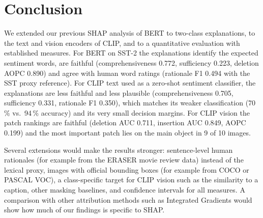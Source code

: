 \documentclass[11pt,a4paper]{article}
\begin{document}
\section{Conclusion}\label{sec:conclusion}

We extended our previous SHAP analysis of BERT to two-class explanations, to the text and
vision encoders of CLIP, and to a quantitative evaluation with established measures. For
BERT on SST-2 the explanations identify the expected sentiment words, are faithful
(comprehensiveness 0.772, sufficiency 0.223, deletion AOPC 0.890) and agree with human word
ratings (rationale F1 0.494 with the SST proxy reference). For CLIP text used as a
zero-shot sentiment classifier, the explanations are less faithful and less plausible
(comprehensiveness 0.705, sufficiency 0.331, rationale F1 0.350), which matches its weaker
classification (70\,\% vs.\ 94\,\% accuracy) and its very small decision margins. For CLIP
vision the patch rankings are faithful (deletion AUC 0.711, insertion AUC 0.849, AOPC 0.199)
and the most important patch lies on the main object in 9 of 10 images.

Several extensions would make the results stronger: sentence-level human rationales (for
example from the ERASER movie review data) instead of the lexical proxy, images with
official bounding boxes (for example from COCO or PASCAL VOC), a class-specific target for
CLIP vision such as the similarity to a caption, other masking baselines, and confidence
intervals for all measures. A comparison with other attribution methods such as Integrated
Gradients would show how much of our findings is specific to SHAP.
\end{document}
